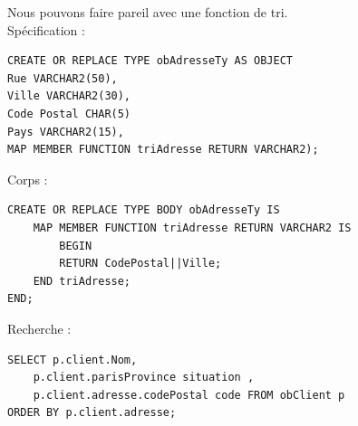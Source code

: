 \documentclass{report}
\begin{document}
Nous pouvons faire pareil avec une fonction de tri.\\
Spécification :
\begin{lstlisting}[style=MySQLStyle]
CREATE OR REPLACE TYPE obAdresseTy AS OBJECT
Rue VARCHAR2(50),
Ville VARCHAR2(30),
Code Postal CHAR(5)
Pays VARCHAR2(15),
MAP MEMBER FUNCTION triAdresse RETURN VARCHAR2);
\end{lstlisting}

Corps :
\begin{lstlisting}[style=MySQLStyle]
CREATE OR REPLACE TYPE BODY obAdresseTy IS
	MAP MEMBER FUNCTION triAdresse RETURN VARCHAR2 IS
		BEGIN
		RETURN CodePostal||Ville;
	END triAdresse;
END;
\end{lstlisting}

Recherche :
\begin{lstlisting}[style=MySQLStyle]
SELECT p.client.Nom,
	p.client.parisProvince situation ,
	p.client.adresse.codePostal code FROM obClient p
ORDER BY p.client.adresse;
\end{lstlisting}
\end{document}
